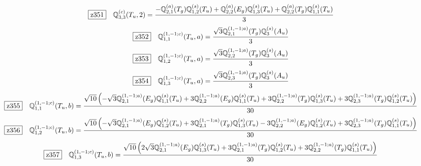 \documentclass[fleqn,10pt,landscape]{jsarticle}
\begin{document}
\begin{dmath*}
\hspace*{3mm}\fbox{z351}\quad \mathbb{Q}_{3,3}^{(c)}(T_{u},2)=\frac{- \mathbb{Q}_{2,1}^{(a)}(T_{g}) \mathbb{Q}_{1,2}^{(s)}(T_{u}) + \mathbb{Q}_{2,2}^{(a)}(E_{g}) \mathbb{Q}_{1,3}^{(s)}(T_{u}) + \mathbb{Q}_{2,2}^{(a)}(T_{g}) \mathbb{Q}_{1,1}^{(s)}(T_{u})}{3}
\end{dmath*}
\begin{dmath*}
\hspace*{3mm}\fbox{z352}\quad \mathbb{Q}_{1,1}^{(1,-1;c)}(T_{u},a)=\frac{\sqrt{3} \mathbb{Q}_{2,1}^{(1,-1;a)}(T_{g}) \mathbb{Q}_{3}^{(s)}(A_{u})}{3}
\end{dmath*}
\begin{dmath*}
\hspace*{3mm}\fbox{z353}\quad \mathbb{Q}_{1,2}^{(1,-1;c)}(T_{u},a)=\frac{\sqrt{3} \mathbb{Q}_{2,2}^{(1,-1;a)}(T_{g}) \mathbb{Q}_{3}^{(s)}(A_{u})}{3}
\end{dmath*}
\begin{dmath*}
\hspace*{3mm}\fbox{z354}\quad \mathbb{Q}_{1,3}^{(1,-1;c)}(T_{u},a)=\frac{\sqrt{3} \mathbb{Q}_{2,3}^{(1,-1;a)}(T_{g}) \mathbb{Q}_{3}^{(s)}(A_{u})}{3}
\end{dmath*}
\begin{dmath*}
\hspace*{3mm}\fbox{z355}\quad \mathbb{Q}_{1,1}^{(1,-1;c)}(T_{u},b)=\frac{\sqrt{10} \left(- \sqrt{3} \mathbb{Q}_{2,1}^{(1,-1;a)}(E_{g}) \mathbb{Q}_{1,1}^{(s)}(T_{u}) + 3 \mathbb{Q}_{2,2}^{(1,-1;a)}(E_{g}) \mathbb{Q}_{1,1}^{(s)}(T_{u}) + 3 \mathbb{Q}_{2,2}^{(1,-1;a)}(T_{g}) \mathbb{Q}_{1,3}^{(s)}(T_{u}) + 3 \mathbb{Q}_{2,3}^{(1,-1;a)}(T_{g}) \mathbb{Q}_{1,2}^{(s)}(T_{u})\right)}{30}
\end{dmath*}
\begin{dmath*}
\hspace*{3mm}\fbox{z356}\quad \mathbb{Q}_{1,2}^{(1,-1;c)}(T_{u},b)=\frac{\sqrt{10} \left(- \sqrt{3} \mathbb{Q}_{2,1}^{(1,-1;a)}(E_{g}) \mathbb{Q}_{1,2}^{(s)}(T_{u}) + 3 \mathbb{Q}_{2,1}^{(1,-1;a)}(T_{g}) \mathbb{Q}_{1,3}^{(s)}(T_{u}) - 3 \mathbb{Q}_{2,2}^{(1,-1;a)}(E_{g}) \mathbb{Q}_{1,2}^{(s)}(T_{u}) + 3 \mathbb{Q}_{2,3}^{(1,-1;a)}(T_{g}) \mathbb{Q}_{1,1}^{(s)}(T_{u})\right)}{30}
\end{dmath*}
\begin{dmath*}
\hspace*{3mm}\fbox{z357}\quad \mathbb{Q}_{1,3}^{(1,-1;c)}(T_{u},b)=\frac{\sqrt{10} \left(2 \sqrt{3} \mathbb{Q}_{2,1}^{(1,-1;a)}(E_{g}) \mathbb{Q}_{1,3}^{(s)}(T_{u}) + 3 \mathbb{Q}_{2,1}^{(1,-1;a)}(T_{g}) \mathbb{Q}_{1,2}^{(s)}(T_{u}) + 3 \mathbb{Q}_{2,2}^{(1,-1;a)}(T_{g}) \mathbb{Q}_{1,1}^{(s)}(T_{u})\right)}{30}
\end{dmath*}
\end{document}
